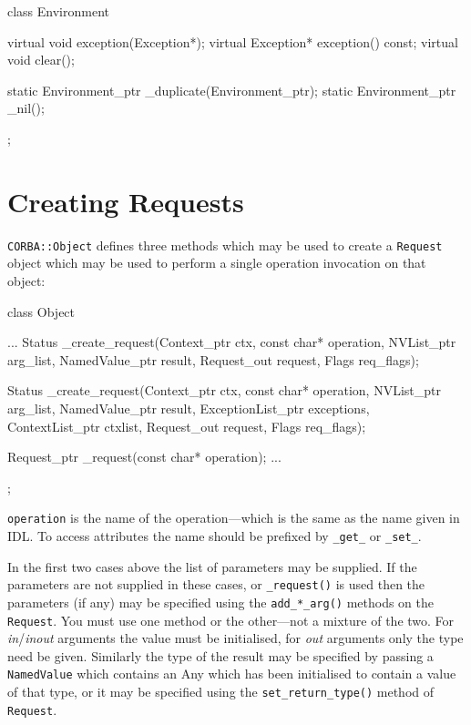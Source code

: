 \documentclass[11pt,twoside,a4paper]{book}
\newcommand{\type}[1]{\texttt{#1}}
\newcommand{\code}[1]{\texttt{#1}}
\newcommand{\op}[1]{\texttt{#1()}}
\begin{document}
\begin{cxxlisting}
class Environment {
  virtual void exception(Exception*);
  virtual Exception* exception() const;
  virtual void clear();

  static Environment_ptr _duplicate(Environment_ptr);
  static Environment_ptr _nil();
};
\end{cxxlisting}



\section{Creating Requests}

\type{CORBA::Object} defines three methods which may be used to create
a \type{Request} object which may be used to perform a single
operation invocation on that object:

\begin{cxxlisting}
class Object {
  ...
  Status _create_request(Context_ptr ctx,
                         const char* operation,
                         NVList_ptr arg_list,
                         NamedValue_ptr result,
                         Request_out request,
                         Flags req_flags);

  Status _create_request(Context_ptr ctx,
                         const char* operation,
                         NVList_ptr arg_list,
                         NamedValue_ptr result,
                         ExceptionList_ptr exceptions,
                         ContextList_ptr ctxlist,
                         Request_out request,
                         Flags req_flags);

  Request_ptr _request(const char* operation);
  ...
};
\end{cxxlisting}


\code{operation} is the name of the operation---which is the same as
the name given in IDL. To access attributes the name should be
prefixed by \code{\_get\_} or \code{\_set\_}.

In the first two cases above the list of parameters may be supplied.
If the parameters are not supplied in these cases, or \op{\_request}
is used then the parameters (if any) may be specified using the
\op{add\_*\_arg} methods on the \type{Request}. You must use one
method or the other---not a mixture of the two. For
\emph{in}/\emph{inout} arguments the value must be initialised, for
\emph{out} arguments only the type need be given.  Similarly the type
of the result may be specified by passing a \type{NamedValue} which
contains an Any which has been initialised to contain a value of that
type, or it may be specified using the \op{set\_return\_type} method
of \type{Request}.
\end{document}
